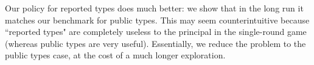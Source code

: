 Our policy for reported types does much better: we show that in the long run it matches our benchmark for public types. This may seem counterintuitive because ``reported types" are completely useless to the principal in the single-round game (whereas public types are very useful). Essentially, we reduce the problem to the public types case, at the cost of a much longer exploration.

